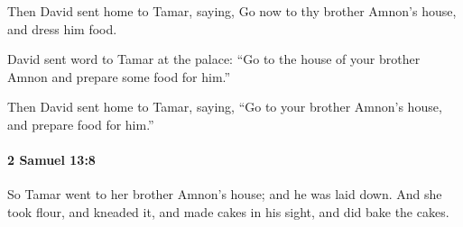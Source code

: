 			\begin{versebox}
					\item[BHS] 
					\item[ASV] Then David sent home to Tamar, saying, Go now to thy brother Amnon's house, and dress him food.
					\item[NIV] David sent word to Tamar at the palace: “Go to the house of your brother Amnon and prepare some food for him.”
					\item[NRSV] Then David sent home to Tamar, saying, “Go to your brother Amnon’s house, and prepare food for him.”
			\end{versebox}

		\paragraph{2 Samuel 13:8} %
			\label{2SAMUEL-13-8}

			So Tamar went to her brother Amnon’s house; and he was laid down. And she took flour, and kneaded it, and made cakes in his sight, and did bake the cakes.

